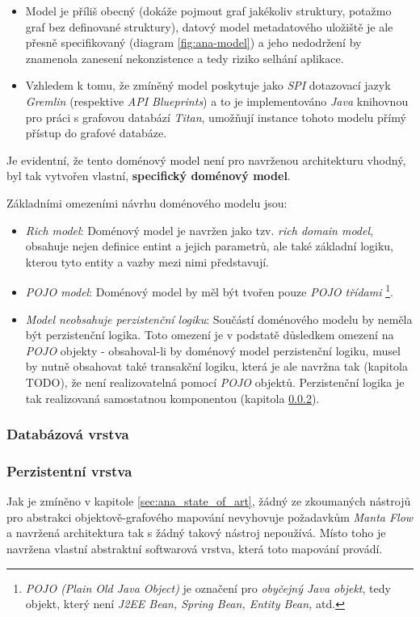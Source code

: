 \begin{itemize}
   \item Model je příliš obecný (dokáže pojmout graf jakékoliv struktury, potažmo graf bez definované struktury), datový model metadatového uložiště je ale přesně specifikovaný (diagram \ref{fig:ana-model}) a jeho nedodržení by znamenola zanesení nekonzistence a tedy riziko selhání aplikace.
   \item Vzhledem k tomu, že zmíněný model poskytuje jako \textit{SPI} dotazovací jazyk \textit{Gremlin} (respektive \textit{API Blueprints}) a to je implementováno \textit{Java} knihovnou pro práci s grafovou databází \textit{Titan}, umožňují instance tohoto modelu přímý přístup do grafové databáze.
\end{itemize}

Je evidentní, že tento doménový model není pro navrženou architekturu vhodný, byl tak vytvořen vlastní, \textbf{specifický doménový model}.

Základními omezeními návrhu doménového modelu jsou:
\begin{itemize}
   \item{\textit{Rich model}}: Doménový model je navržen jako tzv. \textit{rich domain model}, obsahuje nejen definice entint a jejich parametrů, ale také základní logiku, kterou tyto entity a vazby mezi nimi představují.
   \item{\textit{POJO model}}: Doménový model by měl být tvořen pouze \textit{POJO třídami} \footnote{\textit{POJO (Plain Old Java Object)} je označení pro \textit{obyčejný Java objekt}, tedy objekt, který není \textit{J2EE Bean, Spring Bean, Entity Bean,}  atd.}.
   \item{\textit{Model neobsahuje perzistenční logiku}}: Součástí doménového modelu by neměla být perzistenční logika. Toto omezení je v podstatě důsledkem omezení na \textit{POJO} objekty - obsahoval-li by doménový model perzistenční logiku, musel by nutně obsahovat také transakční logiku, která je ale navržna tak (kapitola TODO), že není realizovatelná pomocí \textit{POJO} objektů. Perzistenční logika je tak realizovaná samostatnou komponentou (kapitola \ref{sec:des_persistence}).
\end{itemize}

\subsubsection{Databázová vrstva}
\label{sec:des_database}

\subsubsection{Perzistentní vrstva}
\label{sec:des_persistence}
Jak je zmíněno v kapitole \ref{sec:ana_state_of_art}, žádný ze zkoumaných nástrojů pro abstrakci objektově-grafového mapování nevyhovuje požadavkům \textit{Manta Flow} a navržená architektura tak s žádný takový nástroj nepoužívá. Místo toho je navržena vlastní abstraktní softwarová vrstva, která toto mapování provádí.

